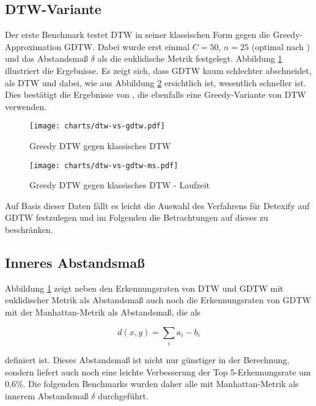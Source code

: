 \subsection{DTW-Variante}
\label{sub:gierig_oder_nicht}

Der erste Benchmark testet DTW in seiner klassischen Form gegen die Greedy-Approximation GDTW. Dabei wurde erst einmal $C=50$, $n=25$ (optimal nach \citet{Golubitsky:2009p1842}) und das Abstandsmaß $\delta$ als die euklidische Metrik festgelegt. Abbildung \ref{chart:dtw-vs-gdtw} illustriert die Ergebnisse. Es zeigt sich, dass GDTW kaum schlechter abschneidet, als DTW und dabei, wie aus Abbildung \ref{chart:dtw-vs-gdtw-ms} ersichtlich ist, wesentlich schneller ist. Dies bestätigt die Ergebnisse von \citet{MacLean:2010p9970}, die ebenfalls eine Greedy-Variante von DTW verwenden.

\begin{figure}[htbp]
  \begin{center}
    \texttt{[image: charts/dtw-vs-gdtw.pdf]}
  \end{center}
  \caption{Greedy DTW gegen klassisches DTW}
  \label{chart:dtw-vs-gdtw}
\end{figure}

\begin{figure}[htbp]
  \begin{center}
    \texttt{[image: charts/dtw-vs-gdtw-ms.pdf]}
  \end{center}
  \caption{Greedy DTW gegen klassisches DTW - Laufzeit}
  \label{chart:dtw-vs-gdtw-ms}
\end{figure}

Auf Basis dieser Daten fällt es leicht die Auswahl des Verfahrens für Detexify auf GDTW festzulegen und im Folgenden die Betrachtungen auf dieses zu beschränken.


\subsection{Inneres Abstandsmaß} %
\label{sub:inneres_abstandsmaß}

Abbildung \ref{chart:dtw-vs-gdtw} zeigt neben den Erkennungsraten von DTW und GDTW mit euklidischer Metrik als Abstandsmaß auch noch die Erkennungsraten von GDTW mit der Manhattan-Metrik als Abstandsmaß, die als

\[ d(x,y) = \sum_i a_i - b_i \]

definiert ist. Dieses Abstandsmaß ist nicht nur günstiger in der Berechnung, sondern liefert auch noch eine leichte Verbesserung der Top 5-Erkennungsrate um 0,6\%. Die folgenden Benchmarks wurden daher alle mit Manhattan-Metrik als innerem Abstandsmaß $\delta$ durchgeführt.

